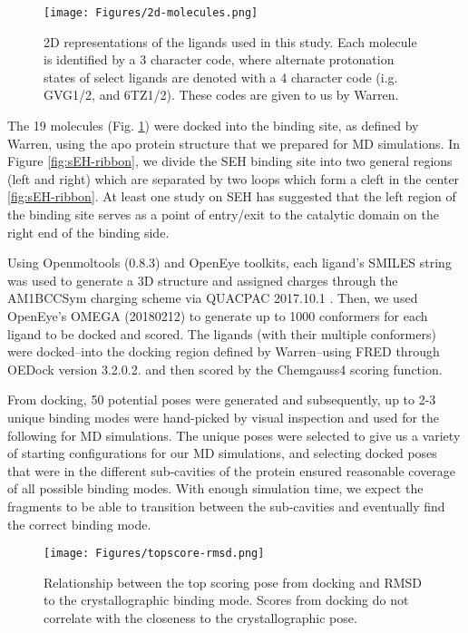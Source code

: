 \documentclass[journal=jcisd8,manuscript=article]{achemso}
\begin{document}
\begin{figure}
    \centering
    \texttt{[image: Figures/2d-molecules.png]}
    \caption{2D representations of the ligands used in this study. Each molecule is identified by a 3 character code, where alternate protonation states of select ligands are denoted with a 4 character code (i.g. GVG1/2, and 6TZ1/2). These codes are given to us by Warren.}
    \label{fig:2D-molecules}
\end{figure}

The 19 molecules (Fig. \ref{fig:2D-molecules}) were docked into the binding site, as defined by Warren, using the apo protein structure that we prepared for MD simulations.
In Figure \ref{fig:sEH-ribbon}, we divide the SEH binding site into two general regions (left and right) which are separated by two loops which form a cleft in the center \ref{fig:sEH-ribbon}.
At least one study on SEH has suggested that the left region of the binding site serves as a point of entry/exit to the catalytic domain on the right end of the binding side\cite{lotz_unbiased_2018}.

Using Openmoltools (0.8.3)\cite{eastman_openmm_2017} and OpenEye toolkits, each ligand's SMILES string was used to generate a 3D structure and assigned charges through the AM1BCCSym charging scheme via QUACPAC 2017.10.1 \cite{jakalian_fast_2002}. 
Then, we used OpenEye's OMEGA (20180212) to generate up to 1000 conformers for each ligand to be docked and scored\cite{hawkins_conformer_2010}.
The ligands (with their multiple conformers) were docked--into the docking region defined by Warren--using FRED through OEDock version 3.2.0.2. and then scored by the Chemgauss4 scoring function\cite{mcgann_fred_2011}.


From docking, 50 potential poses were generated and subsequently, up to 2-3 unique binding modes were hand-picked by visual inspection and used for the following for MD simulations.
The unique poses were selected to give us a variety of starting configurations for our MD simulations, and selecting docked poses that were in the different sub-cavities of the protein ensured reasonable coverage of all possible binding modes.
With enough simulation time, we expect the fragments to be able to transition between the sub-cavities and eventually find the correct binding mode.

\begin{figure}
    \centering
    \texttt{[image: Figures/topscore-rmsd.png]}
    \caption{Relationship between the top scoring pose from docking and RMSD to the crystallographic binding mode. Scores from docking do not correlate with the closeness to the crystallographic pose.}
    \label{fig:topscore_correlation}
\end{figure}
\end{document}
